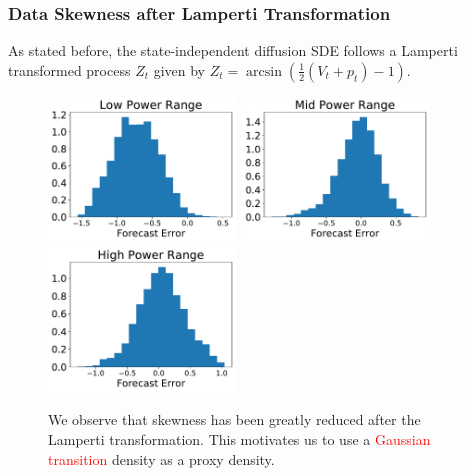 \documentclass[aspectratio=169]{beamer}\usepackage[utf8]{inputenc}
\begin{document}
\begin{frame}\frametitle{Data Skewness after Lamperti Transformation}
As stated before, the state-independent diffusion SDE follows a Lamperti transformed process $Z_t$ given by $Z_t = \arcsin \left( \frac{1}{2} \left( V_t+p_t \right) - 1 \right) $.
\begin{figure}
  \includegraphics[width=50mm,scale=1]{plots/hist_low_lamperti.pdf}
  \includegraphics[width=50mm,scale=1]{plots/hist_mid_lamperti.pdf}
  \includegraphics[width=50mm,scale=1]{plots/hist_high_lamperti.pdf}
  \caption{We observe that skewness has been greatly reduced after the Lamperti transformation. This motivates us to use a \textcolor{red}{Gaussian transition} density as a proxy density.}
\end{figure}
\end{frame}
\end{document}
